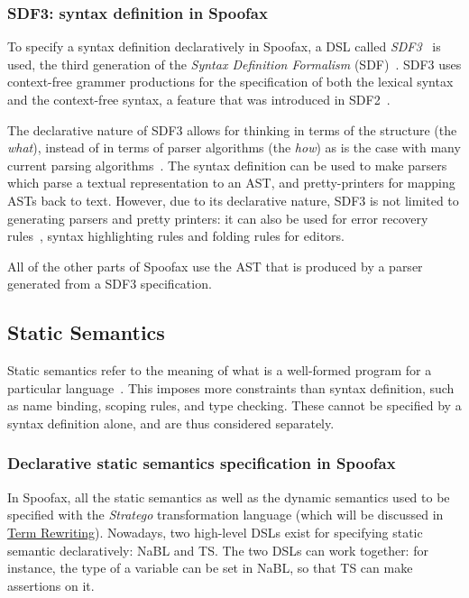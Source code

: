 \subsubsection{SDF3: syntax definition in Spoofax}
\label{sec:orgheadline1}
To specify a syntax definition declaratively in Spoofax, a DSL called
\emph{SDF3}~\cite{Vollebregt12} is used, the third generation of the
\emph{Syntax Definition Formalism} (SDF)~\cite{Heering89}. SDF3 uses
context-free grammer productions for the specification of both the
lexical syntax and the context-free syntax, a feature that was
introduced in SDF2~\cite{Visser97}.

The declarative nature of SDF3 allows for thinking in terms of the
structure (the \emph{what}), instead of in terms of parser algorithms (the
\emph{how}) as is the case with many current parsing
algorithms~\cite{Kats10b}. The syntax definition can be used to
make parsers which parse a textual representation to an AST, and
pretty-printers for mapping ASTs back to text. However, due to its
declarative nature, SDF3 is not limited to generating parsers and
pretty printers: it can also be used for error recovery
rules~\cite{deJonge12}, syntax highlighting rules and folding
rules for editors.

All of the other parts of Spoofax use the AST that is produced by a
parser generated from a SDF3 specification.
\subsection{Static Semantics}
\label{sec-static-analysis}
Static semantics refer to the meaning of what is a well-formed program
for a particular language~\cite{Milner97}. This imposes more
constraints than syntax definition, such as name binding, scoping
rules, and type checking. These cannot be specified by a syntax
definition alone, and are thus considered separately.
\subsubsection{Declarative static semantics specification in Spoofax}
\label{sec:orgheadline2}
In Spoofax, all the static semantics as well as the dynamic semantics
used to be specified with the \emph{Stratego} transformation language
(which will be discussed in \hyperref[sec-term-rewrite]{Term Rewriting}). Nowadays, two high-level
DSLs exist for specifying static semantic declaratively: NaBL and
TS. The two DSLs can work together: for instance, the type of a
variable can be set in NaBL, so that TS can make assertions on it.
